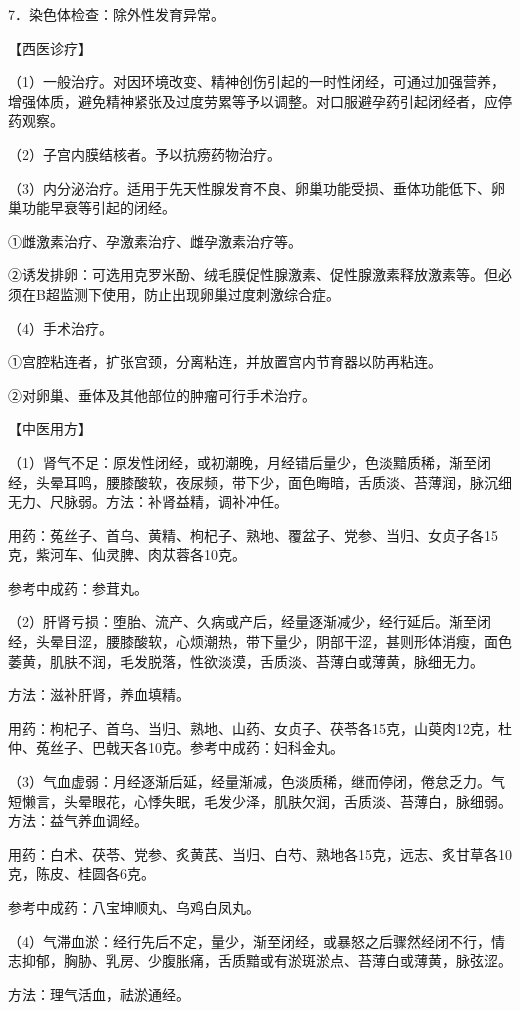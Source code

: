 \documentclass[12pt,UTF8,openany]{ctexbook}
\begin{document}
7．染色体检查：除外性发育异常。

【西医诊疗】

（1）一般治疗。对因环境改变、精神创伤引起的一时性闭经，可通过加强营养，增强体质，避免精神紧张及过度劳累等予以调整。对口服避孕药引起闭经者，应停药观察。

（2）子宫内膜结核者。予以抗痨药物治疗。

（3）内分泌治疗。适用于先天性腺发育不良、卵巢功能受损、垂体功能低下、卵巢功能早衰等引起的闭经。

①雌激素治疗、孕激素治疗、雌孕激素治疗等。

②诱发排卵：可选用克罗米酚、绒毛膜促性腺激素、促性腺激素释放激素等。但必须在B超监测下使用，防止出现卵巢过度刺激综合症。

（4）手术治疗。

①宫腔粘连者，扩张宫颈，分离粘连，并放置宫内节育器以防再粘连。

②对卵巢、垂体及其他部位的肿瘤可行手术治疗。

【中医用方】

（1）肾气不足：原发性闭经，或初潮晚，月经错后量少，色淡黯质稀，渐至闭经，头晕耳鸣，腰膝酸软，夜尿频，带下少，面色晦暗，舌质淡、苔薄润，脉沉细无力、尺脉弱。方法：补肾益精，调补冲任。

用药：菟丝子、首乌、黄精、枸杞子、熟地、覆盆子、党参、当归、女贞子各15克，紫河车、仙灵脾、肉苁蓉各10克。

参考中成药：参茸丸。

（2）肝肾亏损：堕胎、流产、久病或产后，经量逐渐减少，经行延后。渐至闭经，头晕目涩，腰膝酸软，心烦潮热，带下量少，阴部干涩，甚则形体消瘦，面色萎黄，肌肤不润，毛发脱落，性欲淡漠，舌质淡、苔薄白或薄黄，脉细无力。

方法：滋补肝肾，养血填精。

用药：枸杞子、首乌、当归、熟地、山药、女贞子、茯苓各15克，山萸肉12克，杜仲、菟丝子、巴戟天各10克。参考中成药：妇科金丸。

（3）气血虚弱：月经逐渐后延，经量渐减，色淡质稀，继而停闭，倦怠乏力。气短懒言，头晕眼花，心悸失眠，毛发少泽，肌肤欠润，舌质淡、苔薄白，脉细弱。方法：益气养血调经。

用药：白术、茯苓、党参、炙黄芪、当归、白芍、熟地各15克，远志、炙甘草各10克，陈皮、桂圆各6克。

参考中成药：八宝坤顺丸、乌鸡白凤丸。

（4）气滞血淤：经行先后不定，量少，渐至闭经，或暴怒之后骤然经闭不行，情志抑郁，胸胁、乳房、少腹胀痛，舌质黯或有淤斑淤点、苔薄白或薄黄，脉弦涩。

方法：理气活血，祛淤通经。
\end{document}
